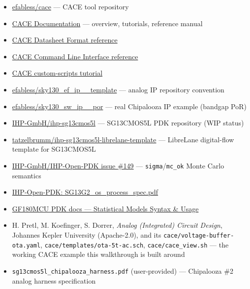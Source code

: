 \documentclass[
]{article}
\providecommand{\tightlist}{%
  \setlength{\itemsep}{0pt}\setlength{\parskip}{0pt}}
\begin{document}
\begin{itemize}
\tightlist
\item
  \href{https://github.com/efabless/cace}{efabless/cace} --- CACE tool
  repository
\item
  \href{https://cace.readthedocs.io/en/latest/}{CACE Documentation} ---
  overview, tutorials, reference manual
\item
  \href{https://cace.readthedocs.io/en/latest/reference/datasheet_format.html}{CACE
  Datasheet Format reference}
\item
  \href{https://cace.readthedocs.io/en/latest/usage/cace_cli.html}{CACE
  Command Line Interface reference}
\item
  \href{https://cace.readthedocs.io/en/latest/tutorials/custom_scripts.html}{CACE
  custom-scripts tutorial}
\item
  \href{https://github.com/efabless/sky130_ef_ip__template}{efabless/sky130\_ef\_ip\_\_template}
  --- analog IP repository convention
\item
  \href{https://github.com/efabless/sky130_sw_ip__por}{efabless/sky130\_sw\_ip\_\_por}
  --- real Chipalooza IP example (bandgap PoR)
\item
  \href{https://github.com/IHP-GmbH/ihp-sg13cmos5l}{IHP-GmbH/ihp-sg13cmos5l}
  --- SG13CMOS5L PDK repository (WIP status)
\item
  \href{https://github.com/tatzelbrumm/ihp-sg13cmos5l-librelane-template}{tatzelbrumm/ihp-sg13cmos5l-librelane-template}
  --- LibreLane digital-flow template for SG13CMOS5L
\item
  \href{https://github.com/IHP-GmbH/IHP-Open-PDK/issues/149}{IHP-GmbH/IHP-Open-PDK
  issue \#149} --- \texttt{sigma}/\texttt{mc\_ok} Monte Carlo semantics
\item
  \href{https://github.com/IHP-GmbH/IHP-Open-PDK/blob/main/ihp-sg13g2/libs.doc/doc/SG13G2_os_process_spec.pdf}{IHP-Open-PDK:
  SG13G2\_os\_process\_spec.pdf}
\item
  \href{https://gf180mcu-pdk.readthedocs.io/en/latest/analog/model_parameters/HV/HV_4_1.html}{GF180MCU
  PDK docs --- Statistical Models Syntax \& Usage}
\item
  H. Pretl, M. Koefinger, S. Dorrer, \emph{Analog (Integrated) Circuit
  Design}, Johannes Kepler University (Apache-2.0), and its
  \texttt{cace/voltage-buffer-ota.yaml},
  \texttt{cace/templates/ota-5t-ac.sch}, \texttt{cace/cace\_view.sh} ---
  the working CACE example this walkthrough is built around
\item
  \texttt{sg13cmos5l\_chipalooza\_harness.pdf} (user-provided) ---
  Chipalooza \#2 analog harness specification
\end{itemize}
\end{document}
